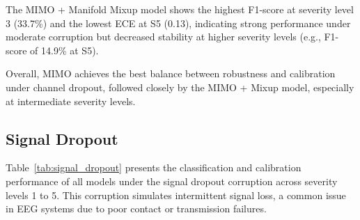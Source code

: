 The MIMO + Manifold Mixup model shows the highest F1-score at severity level 3 (33.7\%) and the lowest ECE at S5 (0.13), indicating strong performance under moderate corruption but decreased stability at higher severity levels (e.g., F1-score of 14.9\% at S5).

Overall, MIMO achieves the best balance between robustness and calibration under channel dropout, followed closely by the MIMO + Mixup model, especially at intermediate severity levels.

\subsection{Signal Dropout}
\label{subsec:signal_dropout}

Table~\ref{tab:signal_dropout} presents the classification and calibration performance of all models under the signal dropout corruption across severity levels 1 to 5. This corruption simulates intermittent signal loss, a common issue in EEG systems due to poor contact or transmission failures.

\begin{table}[htbp]
\centering
{}
\caption[Classification and calibration performance under signal dropout]{Classification and calibration performance under signal dropout corruption at severity levels 1 to 5. S1–S5 denote severity levels.}
\label{tab:signal_dropout}
\end{table}

